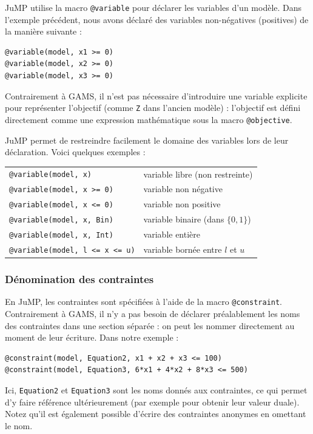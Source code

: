 JuMP utilise la macro \verb|@variable| pour déclarer les variables d'un modèle.
Dans l'exemple précédent, nous avons déclaré des variables non-négatives (positives) de la manière suivante :
\begin{verbatim}
@variable(model, x1 >= 0)
@variable(model, x2 >= 0)
@variable(model, x3 >= 0)
\end{verbatim}
Contrairement à GAMS, il n'est pas nécessaire d'introduire une variable explicite pour représenter l'objectif (comme \verb|Z| dans l'ancien modèle) : l'objectif est défini directement comme une expression mathématique sous la macro \verb|@objective|.

JuMP permet de restreindre facilement le domaine des variables lors de leur déclaration. Voici quelques exemples :\\
\begin{tabular}{ll}
\verb|@variable(model, x)| & variable libre (non restreinte) \\
\verb|@variable(model, x >= 0)| & variable non négative \\
\verb|@variable(model, x <= 0)| & variable non positive \\
\verb|@variable(model, x, Bin)| & variable binaire (dans $\lbrace 0, 1\rbrace$) \\
\verb|@variable(model, x, Int)| & variable entière \\
\verb|@variable(model, l <= x <= u)| & variable bornée entre $l$ et $u$
\end{tabular}

\subsubsection{Dénomination des contraintes}

En JuMP, les contraintes sont spécifiées à l'aide de la macro \verb|@constraint|. Contrairement à GAMS, il n'y a pas besoin de déclarer préalablement les noms des contraintes dans une section séparée : on peut les nommer directement au moment de leur écriture. 
Dans notre exemple :
\begin{verbatim}
@constraint(model, Equation2, x1 + x2 + x3 <= 100)
@constraint(model, Equation3, 6*x1 + 4*x2 + 8*x3 <= 500)
\end{verbatim}
Ici, \verb|Equation2| et \verb|Equation3| sont les noms donnés aux contraintes, ce qui permet d'y faire référence ultérieurement (par exemple pour obtenir leur valeur duale). Notez qu'il est également possible d'écrire des contraintes anonymes en omettant le nom.

